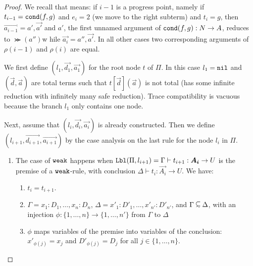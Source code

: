 \begin{proof}
 We recall that  means: 
 if $i-1$ is a progress point, namely if $t_{i-1}={\tt cond}(f,g)$ and $e_i=2$ 
 (we move to the right subterm) and $t_i=g$, then $\vec{a_{i-1}} = a',\vec{a'}$ 
 and $a'$, the first unnamed argument of ${\tt cond}(f,g) : {N} \rightarrow A$, 
 reduces to $\Succ(a'')$w hile $\vec{a_i} = a'',\vec{a'}$.
 In all other cases two corresponding arguments of $\rho(i-1)$ and $\rho(i)$ are equal.

  We first define $(l_1,\vec{d_1},\vec{a_1})$ for the root node $t$ of $\Pi$.
  In this case $l_1 = {\tt nil}$ 
   and $(\vec{d},\vec{a})$ are total terms such that $t[\vec{d}](\vec{a})$ is not total
   (has some infinite reduction with infinitely many safe reduction).
  Trace compatibility is vacuous because the branch $l_1$ only contains one node.

  Next, assume that $(l_i,\vec{d_i},\vec{a_i})$ is already constructed.
  Then we define $(l_{i+1},\vec{d_{i+1}},\vec{a_{i+1}})$ by the case analysis on
  the last rule for the node $l_i$ in $\Pi$. 




\begin{enumerate}

\item
  The case of ${\tt weak}$ happens when
  $\Label(\Pi,l_{i+1}) = \Gamma \vdash t_{i+1}:\vec{A_i}\rightarrow U$
  is the premise of a ${\tt weak}$-rule, with conclusion
  $\Delta \vdash t_{i}:\vec{A_i}\rightarrow U$. We have:

\begin{enumerate}
\item
 $t_i = t_{i+1}$. 
\item
  $\Gamma = x_1:D_1,\ldots,x_n:D_n$, $\Delta= x'_1:D'_1,\ldots,x'_{n'}:D'_{n'}$, and 
  $\Gamma \subseteqsim \Delta$,
  with an injection $\phi:\{1,\ldots,n\}\to\{1,\ldots,n'\}$ from $\Gamma$ to $\Delta$
\item
  $\phi$ maps variables of the premise into variables of the conclusion:
   $x'_{\phi(j)} = x_j$ and $D'_{\phi(j)} = D_j$ for all $j \in \{1,\ldots,n\}$.
\end{enumerate}


\end{enumerate}
\end{proof}
